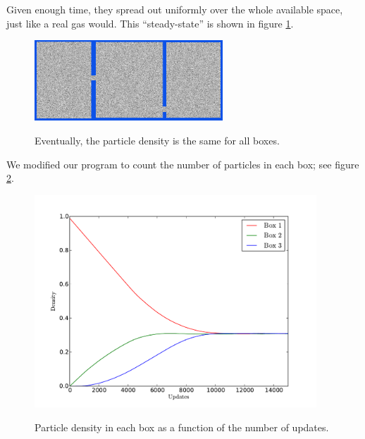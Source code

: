 \documentclass[12pt,a4paper]{article}
\begin{document}
Given enough time, they spread out uniformly over the whole available space, just like a real gas would.
This ``steady-state'' is shown in figure \ref{diffusionend}.
\begin{figure}[htp]
\centering
  \includegraphics[width=200pt]{figs/diffusionend.png}
\label{diffusionend}
\caption{Eventually, the particle density is the same for all boxes.}
\end{figure}

We modified our program to count the number of particles in each box; see figure \ref{gascount}.
\begin{figure}[htp]
\centering
  \includegraphics[width=300pt]{figs/gascount.pdf}
\label{gascount}
\caption{Particle density in each box as a function of the number of updates.}
\end{figure}
\end{document}

